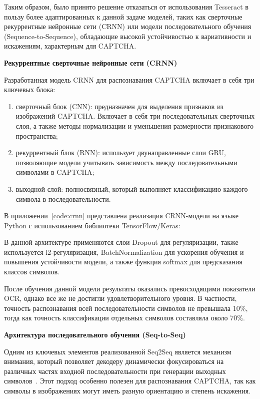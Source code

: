 Таким образом, было принято решение отказаться от использования Tesseract в 
пользу более адаптированных к данной задаче моделей, таких как сверточные 
рекуррентные нейронные сети (CRNN) или модели последовательного обучения 
(Sequence-to-Sequence), обладающие высокой устойчивостью к вариативности и 
искажениям, характерным для CAPTCHA.

\textbf{Рекуррентные сверточные нейронные сети (CRNN)}

Разработанная модель CRNN для распознавания CAPTCHA включает в себя три ключевых 
блока:

\begin{enumerate}
    \item сверточный блок (CNN): предназначен для выделения признаков из 
    изображений CAPTCHA. Включает в себя три последовательных сверточных слоя, а 
    также методы нормализации и уменьшения размерности признакового пространства;
    \item рекуррентный блок (RNN): использует двунаправленные слои GRU, 
    позволяющие модели учитывать зависимость между последовательными символами в 
    CAPTCHA;
    \item выходной слой: полносвязный, который выполняет классификацию каждого 
    символа в последовательности.
\end{enumerate}

В приложении~\ref{code:crnn} представлена реализация CRNN-модели на языке Python 
с использованием библиотеки TensorFlow/Keras:

В данной архитектуре применяются слои Dropout для регуляризации, также 
используется l2-регуляризация, BatchNormalization для ускорения обучения и 
повышения устойчивости модели, а также функция softmax для предсказания классов 
символов.

После обучения данной модели результаты оказались превосходящими показатели OCR, 
однако все же не достигли удовлетворительного уровня. В частности, точность 
распознавания всей последовательности символов не превышала 10\%, тогда как 
точность классификации отдельных символов составляла около 70\%.

\textbf{Архитектура последовательного обучения (Seq-to-Seq)}

Одним из ключевых элементов реализованной Seq2Seq является механизм внимания, 
который позволяет декодеру динамически фокусироваться на различных частях входной 
последовательности при генерации выходных символов~\cite{Seq2SeqBook}. Этот 
подход особенно полезен для распознавания CAPTCHA, так как символы в изображениях 
могут иметь разную ориентацию и степень искажения.


